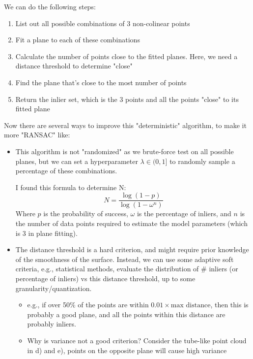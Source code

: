 \documentclass[conference,onecolumn]{IEEEtran}
\begin{document}
\begin{enumerate}[label=\arabic{enumi}.]
\begin{enumerate}
                        We can do the following steps:
                        \begin{enumerate}
                              \item List out all possible combinations of 3 non-colinear points
                              \item Fit a plane to each of these combinations
                              \item Calculate the number of points close to the fitted planes. Here, we need a distance threshold to determine "close"
                              \item Find the plane that's close to the most number of points
                              \item Return the inlier set, which is the 3 points and all the points "close" to its fitted plane
                        \end{enumerate}
                        Now there are several ways to improve this "deterministic" algorithm, to make it more "RANSAC" like:
                        \begin{itemize}
                              \item This algorithm is not "randomized" as we brute-force test on all possible planes, but we can set a hyperparameter $\lambda \in (0, 1]$ to randomly sample a percentage of these combinations.

                                    I found this formula to determine N:
                                    $$
                                          N = \frac{\log(1 - p)}{\log(1 - \omega^n)}
                                    $$
                                    Where $p$ is the probability of success, $\omega$ is the percentage of inliers, and $n$ is the number of data points required to estimate the model parameters (which is 3 in plane fitting).
                              \item The distance threshold is a hard criterion, and might require prior knowledge of the smoothness of the surface.
                                    Instead, we can use some adaptive soft criteria, e.g., statistical methods, evaluate the distribution of \# inliers (or percentage of inliers) vs this distance threshold, up to some granularity/quantization.
                                    \begin{itemize}
                                          \item e.g., if over 50\% of the points are within $0.01 \times \text{max distance}$, then this is probably a good plane, and all the points within this distance are probably inliers.
                                          \item Why is variance not a good criterion? Consider the tube-like point cloud in d) and e), points on the opposite plane will cause high variance
                                    \end{itemize}
                        \end{itemize}


\end{enumerate}
\end{enumerate}
\end{document}
